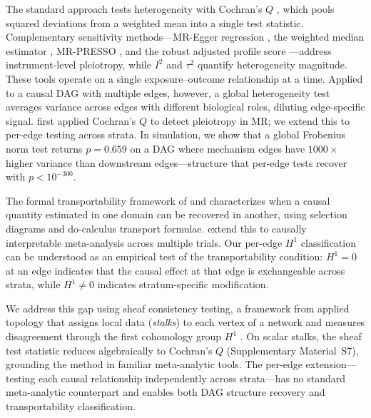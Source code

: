 \documentclass[11pt]{article}
\begin{document}
The standard approach tests heterogeneity with Cochran's $Q$ \citep{cochran1954combination}, which pools squared deviations from a weighted mean into a single test statistic.
Complementary sensitivity methods---MR-Egger regression \citep{bowden2015mendelian}, the weighted median estimator \citep{bowden2016consistent}, MR-PRESSO \citep{verbanck2018detection}, and the robust adjusted profile score \citep{zhao2020statistical}---address instrument-level pleiotropy, while $I^2$ \citep{higgins2002quantifying, higgins2003measuring} and $\tau^2$ \citep{dersimonian1986meta} quantify heterogeneity magnitude.
These tools operate on a single exposure--outcome relationship at a time.
Applied to a causal DAG with multiple edges, however, a global heterogeneity test averages variance across edges with different biological roles, diluting edge-specific signal.
\citet{delgreco2015detecting} first applied Cochran's $Q$ to detect pleiotropy in MR; we extend this to per-edge testing across strata.
In simulation, we show that a global Frobenius norm test returns $p = 0.659$ on a DAG where mechanism edges have $1000\times$ higher variance than downstream edges---structure that per-edge tests recover with $p < 10^{-300}$.

The formal transportability framework of \citet{bareinboim2016causal} and \citet{pearl2014external} characterizes when a causal quantity estimated in one domain can be recovered in another, using selection diagrams and do-calculus transport formulae.
\citet{dahabreh2023efficient} extend this to causally interpretable meta-analysis across multiple trials.
Our per-edge $H^1$ classification can be understood as an empirical test of the transportability condition: $H^1 = 0$ at an edge indicates that the causal effect at that edge is exchangeable across strata, while $H^1 \neq 0$ indicates stratum-specific modification.

We address this gap using sheaf consistency testing, a framework from applied topology that assigns local data (\emph{stalks}) to each vertex of a network and measures disagreement through the first cohomology group $H^1$ \citep{robinson2014topological, curry2014sheaves, hansen2020laplacians}.
On scalar stalks, the sheaf test statistic reduces algebraically to Cochran's $Q$ (Supplementary Material~S7), grounding the method in familiar meta-analytic tools.
The per-edge extension---testing each causal relationship independently across strata---has no standard meta-analytic counterpart and enables both DAG structure recovery and transportability classification.
\end{document}

